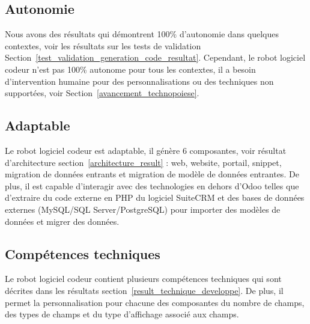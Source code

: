 \subsection{Autonomie}
Nous avons des résultats qui démontrent 100\% d'autonomie dans quelques contextes, voir les résultats sur les tests de validation Section~\ref{test_validation_generation_code_resultat}. Cependant, le robot logiciel codeur n'est pas 100\% autonome pour tous les contextes, il a besoin d'intervention humaine pour des personnalisations ou des techniques non supportées, voir Section~\ref{avancement_technopoiese}.


\subsection{Adaptable}
Le robot logiciel codeur est adaptable, il génère 6 composantes, voir résultat d'architecture section~\ref{architecture_result} : web, website, portail, snippet, migration de données entrants et migration de modèle de données entrantes. De plus, il est capable d'interagir avec des technologies en dehors d'Odoo telles que d'extraire du code externe en PHP du logiciel SuiteCRM et des bases de données externes (MySQL/SQL Server/PostgreSQL) pour importer des modèles de données et migrer des données.


\subsection{Compétences techniques}
Le robot logiciel codeur contient plusieurs compétences techniques qui sont décrites dans les résultats section~\ref{result_technique_developpe}. De plus, il permet la personnalisation pour chacune des composantes du nombre de champs, des types de champs et du type d'affichage associé aux champs.


